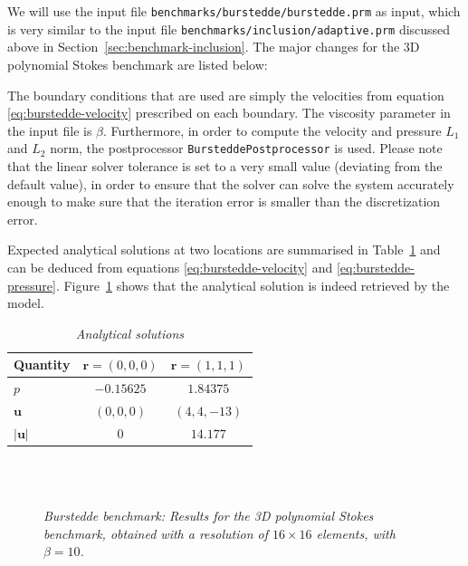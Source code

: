 \documentclass{article}
\begin{document}
We will use the input file \texttt{benchmarks/burstedde/burstedde.prm} as
input, which is very similar to the input file
\texttt{benchmarks/inclusion/adaptive.prm} discussed above in
Section~\ref{sec:benchmark-inclusion}. The major changes for the 3D polynomial
Stokes benchmark are listed below:



The boundary conditions that are used are simply the velocities from equation
\eqref{eq:burstedde-velocity} prescribed on each boundary. The viscosity parameter in the input
file is $\beta$. Furthermore, in order to compute the velocity and pressure
$L_1$ and $L_2$ norm, the postprocessor \texttt{BursteddePostprocessor} is
used. Please note that the linear solver tolerance is set to a very small
value (deviating from the default value), in order to ensure that the solver
can solve the system accurately enough to make sure that the iteration
error is smaller than the discretization error.

Expected analytical solutions at two locations are summarised in Table~\ref{tab:burstedde-table} and can be deduced from equations \eqref{eq:burstedde-velocity} and
\eqref{eq:burstedde-pressure}.
Figure~\ref{fig:burstedde-benchmark} shows that the analytical solution is indeed retrieved by the model.

\begin{table}[h!]
\caption{\it Analytical solutions \label{tab:burstedde-table}}
\centering
\begin{tabular}{l|c|c}
Quantity & $\mathbf{r} = (0,0,0)$ & $\mathbf{r} = (1,1,1)$ \\ \hline
$p$ & $-0.15625$ & $1.84375$ \\
$\mathbf{u}$ & $(0,0,0)$  & $(4,4,-13)$ \\
$|\mathbf{u}|$ & $0$ &  $14.177$ \\
\end{tabular}
\end{table}

\begin{figure}[t!]
  \centering
  ~
  \\
  ~
  \caption{\it Burstedde benchmark: Results for the 3D polynomial Stokes benchmark, obtained with a resolution of $16\times 16$ elements, with $\beta = 10$.}\label{fig:burstedde-benchmark}
\end{figure}
\end{document}
